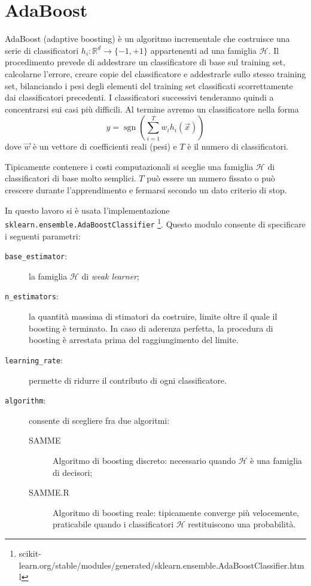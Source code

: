 \documentclass[12pt,a4paper,oneside,hidelinks]{report}
\DeclareMathOperator{\sgn}{sgn}
\begin{document}
\section{AdaBoost}
AdaBoost (adaptive boosting) è un algoritmo incrementale che costruisce una serie di classificatori $ h_{i}:\mathbb{R}^{d}\rightarrow \{-1,+1\} $ appartenenti ad una famiglia $ \mathcal{H} $. 
Il procedimento prevede di addestrare un classificatore di base sul training set, calcolarne l'errore, creare copie del classificatore e addestrarle sullo stesso training set, bilanciando i pesi degli elementi del training set classificati scorrettamente dai classificatori precedenti. I classificatori successivi tenderanno quindi a concentrarsi sui casi più difficili.
Al termine avremo un classificatore nella forma
\[\hat{y}=\sgn(\sum_{i=1}^{T} w_{i}h_{i}(\vec{x}))\]
dove $ \vec{w} $ è un vettore di coefficienti reali (pesi) e $ T $ è il numero di classificatori.

Tipicamente contenere i costi computazionali si sceglie una famiglia $ \mathcal{H} $ di classificatori di base molto semplici. $ T $ può essere un numero fissato o può crescere durante l'apprendimento e fermarsi secondo un dato criterio di stop.

In questo lavoro si è usata l'implementazione \texttt{sklearn.ensemble.AdaBoostClassifier}
\footnote{scikit-learn.org/stable/modules/generated/sklearn.ensemble.AdaBoostClassifier.html}.
Questo modulo consente di specificare i seguenti parametri:

\begin{description}
\item[\texttt{base\_estimator}:]la famiglia $ \mathcal{H} $ di \emph{weak learner};
\item[\texttt{n\_estimators}:]la quantità massima di stimatori da costruire, limite oltre il quale il boosting è terminato.
In caso di aderenza perfetta, la procedura di boosting è arrestata prima del raggiungimento del limite.
\item[\texttt{learning\_rate}:] permette di ridurre il contributo di ogni classificatore.
\item[\texttt{algorithm}:]consente di scegliere fra due algoritmi:
\begin{description}
\item[SAMME]Algoritmo di boosting discreto: necessario quando $ \mathcal{H} $ è una famiglia di decisori;
\item[SAMME.R]Algoritmo di boosting reale: tipicamente converge più velocemente, praticabile quando i classificatori $ \mathcal{H} $ restituiscono una probabilità.
\end{description}
\end{description}
 
\end{document}
